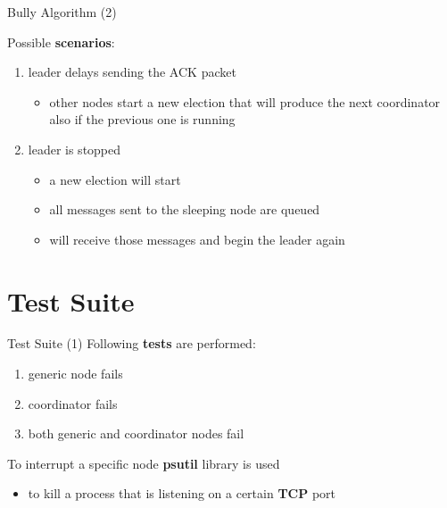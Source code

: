 \documentclass{beamer}
\begin{document}
        \begin{frame}{Bully Algorithm (2)}
	 
	 Possible \textbf{scenarios}: 
	   
	   \begin{enumerate}
	       \item leader delays sending the ACK packet 
	       \begin{itemize}
	           \item other nodes start a new election that will produce the next coordinator also if the previous one is running
	       \end{itemize}
	       \item leader is stopped 
	       \begin{itemize}
	        \item a new election will start 
	        \item all messages sent to the sleeping node are queued
	        \item will receive those messages and begin the leader again
	       \end{itemize}
	   \end{enumerate}
	   
	 \end{frame}
	 
	 
	 \section{Test Suite}
	 
	 \begin{frame}{Test Suite (1)}
	     Following \textbf{tests} are performed:
	     \begin{enumerate}
	        \item generic node fails
	        \item coordinator fails
            \item both generic and coordinator nodes fail
	 \end{enumerate}\pause
	 
	 To interrupt a specific node \textbf{psutil} library is used
	 \begin{itemize}
	     \item to kill a process that is listening on a certain \textbf{TCP} port
	 \end{itemize}
	 
	 \lstVI

	 \end{frame}
	 
\end{document}
